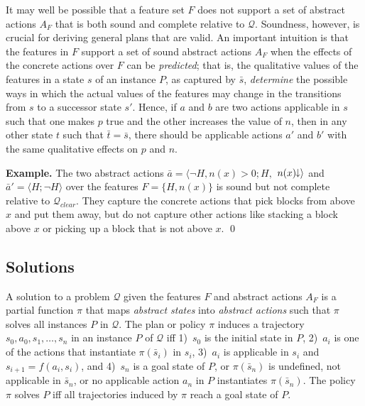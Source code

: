 \documentclass[letterpaper]{article} %
\newcommand{\tup}[1]{\langle #1 \rangle}
\newenvironment{example}{\noindent\textbf{Example.}\xspace}{\qed}
\newcommand{\Q}{\mathcal{Q}}
\newcommand{\abst}[2]{\tup{#1;#2}}
\newcommand{\mminus}{\hspace{-.05em}\raisebox{.15ex}{\footnotesize$\downarrow$}}
\begin{document}
It may well be possible  that a  feature set $F$ does not  support a set of abstract actions $A_F$
that is both sound and complete relative to $\Q$. Soundness, however, is  crucial for deriving general plans that are valid.
An important intuition is that the features in $F$ support a set of sound abstract actions $A_F$ when the
effects of the concrete actions over $F$ can be \emph{predicted};
that is, the qualitative values of the features in a state $s$ of an instance $P$, 
as captured by $\bar{s}$, \emph{determine} the possible ways in which the actual
values of the features may change in the transitions from $s$ to a successor state $s'$.
Hence, if $a$ and $b$ are two actions applicable in $s$ such that one makes 
$p$ true and the other increases the value of $n$, then in any other state $t$ 
such that $\bar{t}=\bar{s}$, there should be applicable actions $a'$ and $b'$
with the same qualitative effects on $p$ and $n$.


\medskip
\begin{example}
  The two abstract actions  $\bar a = \langle \neg H,n(x)>0; H,$ $n(x)\mminus\rangle$ %
  and $\bar{a}'=\abst{H}{\neg H}$ over the features  $F=\{H,n(x)\}$
  is sound but not complete relative to $\Q_{clear}$. 
  They capture the concrete actions that pick blocks from above $x$ and put them away,
  but do not capture other actions like stacking a block above $x$ or picking up a block that is not above $x$.
\end{example}


\subsection{Solutions}

A solution to a problem $\Q$ given the features $F$ and abstract
actions $A_F$ is a partial function $\pi$ that maps \emph{abstract states}
into \emph{abstract actions} such that $\pi$ solves all instances $P$ in $\Q$.
The plan or policy $\pi$ induces a trajectory $s_0,a_0,s_1, \ldots, s_n$ in
an instance $P$ of $\Q$ iff
1)~$s_0$ is the initial state in $P$,
2)~$a_i$ is one of the actions that instantiate $\pi(\bar{s}_i)$ in $s_i$,
3)~$a_i$ is applicable in $s_i$ and $s_{i+1}=f(a_i,s_i)$, and
4)~$s_n$ is a goal state of $P$, or $\pi(\bar{s}_n)$ is undefined,
not applicable in $\bar s_n$, or no applicable action $a_n$ in $P$ instantiates $\pi(\bar{s}_n)$.
The policy $\pi$ solves $P$ iff all trajectories induced by $\pi$ reach a goal state of $P$.
\end{document}
